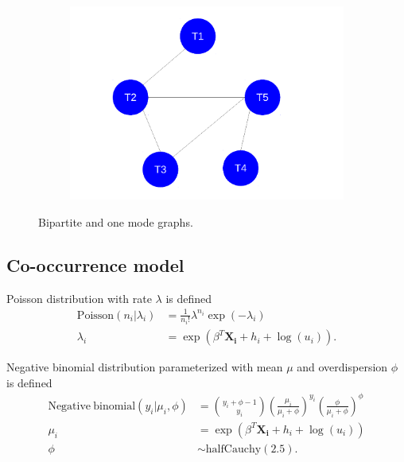 \documentclass[12pt,letterpaper]{article}
\begin{document}
\begin{figure}[ht]
  \begin{subfigure}[b]{0.4\textwidth}
    \caption{}
    \includegraphics[height = 0.5\textheight, width = \textwidth, keepaspectratio = true]{figure/one_mode}
    \label{subfig:one_mode}
  \end{subfigure}
  \caption{Bipartite and one mode graphs.}
  \label{fig:graphs}
\end{figure}


\subsection{Co-occurrence model}

Poisson distribution with rate \(\lambda\) is defined 
\begin{align}
  \mathrm{Poisson}(n_{i} | \lambda_{i}) &= \frac{1}{n_{i}!} \lambda^{n_{i}} \exp(-\lambda_{i}) 
  \label{eq:pois} \\
  \lambda_{i} &= \exp(\beta^{T}\mathbf{X_{i}} + h_{i} + \log(u_{i})).
  \label{eq:lambda}
\end{align}

Negative binomial distribution parameterized with mean \(\mu\) and overdispersion \(\phi\) is defined
\begin{align}
  \mathrm{Negative\ binomial}(y_{i} | \mu_{i}, \phi) &= {y_{i} + \phi -1 \choose y_{i}} \left(\frac{\mu_{i}}{\mu_{i} + \phi}\right)^{y_{i}} \left(\frac{\phi}{\mu_{i} + \phi}\right)^{\phi}
  \label{eq:neg_bin} \\
  \mu_{i} &= \exp(\beta^{T}\mathbf{X_{i}} + h_{i} + \log(u_{i})) 
  \label{eq:mu} \\
  \phi &\sim \mathrm{halfCauchy}(2.5).
  \label{eq:phi} 
\end{align}
\end{document}
